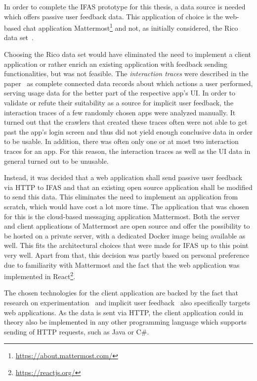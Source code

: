 In order to complete the \ac{IFAS} prototype for this thesis, a data source is needed which offers passive user feedback data.
This application of choice is the web-based chat application Mattermost\footnote{\url{https://about.mattermost.com/}} and not, as initially considered, the Rico data set~\cite{Deka:2017:Rico}.

Choosing the Rico data set would have eliminated the need to implement a client application or rather enrich an existing application with feedback sending functionalities, but was not feasible.
The \emph{interaction traces} were described in the paper~\cite{Deka:2017:Rico} as complete connected data records about which actions a user performed, serving usage data for the better part of the respective app's \ac{UI}.
In order to validate or refute their suitability as a source for implicit user feedback, the interaction traces of a few randomly chosen apps were analyzed manually.
It turned out that the crawlers that created these traces often were not able to get past the app's login screen and thus did not yield enough conclusive data in order to be usable.
In addition, there was often only one or at most two interaction traces for an app.
For this reason, the interaction traces as well as the \ac{UI} data in general turned out to be unusable.

Instead, it was decided that a web application shall send passive user feedback via \ac{HTTP} to \ac{IFAS} and that an existing open source application shall be modified to send this data.
This eliminates the need to implement an application from scratch, which would have cost a lot more time.
The application that was chosen for this is the cloud-based messaging application Mattermost.
Both the server and client applications of Mattermost are open source and offer the possibility to be hosted on a private server, with a dedicated Docker image being available as well.
This fits the architectural choices that were made for \ac{IFAS} up to this point very well.
Apart from that, this decision was partly based on personal preference due to familiarity with Mattermost and the fact that the web application was implemented in React\footnote{\url{https://reactjs.org/}}.

The chosen technologies for the client application are backed by the fact that research on experimentation~\cite{Dmitriev2017,Kohavi2013a} and implicit user feedback~\cite{Joachims2005,Huang2011} also specifically targets web applications.
As the data is sent via \ac{HTTP}, the client application could in theory also be implemented in any other programming language which supports sending of \ac{HTTP} requests, such as Java or C\#.

